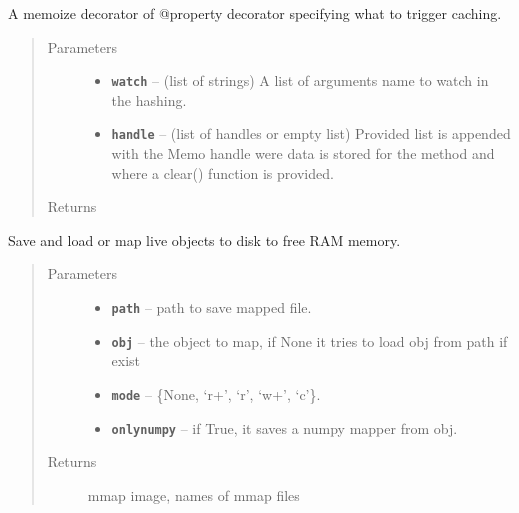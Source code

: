\documentclass[letterpaper,10pt,english]{sphinxmanual}
\begin{document}
\begin{fulllineitems}
\label{RRtoolbox.lib:RRtoolbox.lib.cache.cachedProperty}
A memoize decorator of @property decorator specifying what to trigger caching.
\begin{quote}\begin{description}
\item[{Parameters}] \leavevmode\begin{itemize}
\item {} 
\textbf{\texttt{watch}} -- (list of strings) A list of arguments name to watch in the hashing.

\item {} 
\textbf{\texttt{handle}} -- (list of handles or empty list) Provided list is appended with the Memo
handle were data is stored for the method and where a clear() function is provided.

\end{itemize}

\item[{Returns}] \leavevmode


\end{description}\end{quote}

\end{fulllineitems}


\begin{fulllineitems}
\label{RRtoolbox.lib:RRtoolbox.lib.cache.mapper}
Save and load or map live objects to disk to free RAM memory.
\begin{quote}\begin{description}
\item[{Parameters}] \leavevmode\begin{itemize}
\item {} 
\textbf{\texttt{path}} -- path to save mapped file.

\item {} 
\textbf{\texttt{obj}} -- the object to map, if None it tries to load obj from path if exist

\item {} 
\textbf{\texttt{mode}} -- \{None, `r+', `r', `w+', `c'\}.

\item {} 
\textbf{\texttt{onlynumpy}} -- if True, it saves a numpy mapper from obj.

\end{itemize}

\item[{Returns}] \leavevmode
mmap image, names of mmap files

\end{description}\end{quote}

\end{fulllineitems}
\end{document}
